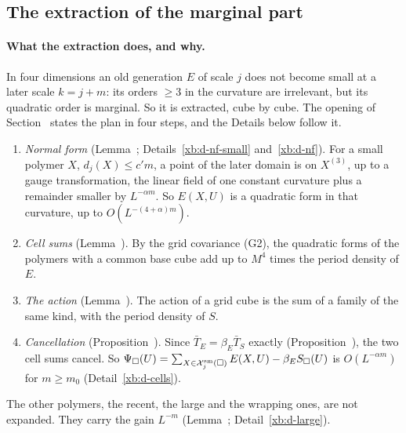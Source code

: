 \subsection{The extraction of the marginal part}\label{xb:extraction}

\paragraph{What the extraction does, and why.} In four dimensions an old generation $E$ of scale $j$ does not become small at a later scale $k=j+m$: its orders $\ge3$ in the curvature are irrelevant, but its quadratic order is marginal. So it is extracted, cube by cube. The opening of Section~ states the plan in four steps, and the Details below follow it.
\begin{enumerate}[label=(\arabic*)]
\item \emph{Normal form} (Lemma~; Details~\ref{xb:d-nf-small} and~\ref{xb:d-nf}). For a small polymer $X$, $d_j(X)\le c'm$, a point of the later domain is on $X^{(3)}$, up to a gauge transformation, the linear field of one constant curvature plus a remainder smaller by $L^{-\alpha m}$. So $E(X,U)$ is a quadratic form in that curvature, up to $O(L^{-(4+\alpha)m})$.
\item \emph{Cell sums} (Lemma~). By the grid covariance (G2), the quadratic forms of the polymers with a common base cube add up to $M^4$ times the period density of $E$.
\item \emph{The action} (Lemma~). The action of a grid cube is the sum of a family of the same kind, with the period density of $S$.
\item \emph{Cancellation} (Proposition~). Since $\bar T_E=\beta_E\bar T_S$ exactly (Proposition~), the two cell sums cancel. So $\Psi_\Box(U)=\sum_{X\in\mathcal X^{\rm sm}_j(\Box)}E(X,U)-\beta_ES_\Box(U)$ is $O(L^{-\alpha m})$ for $m\ge m_0$ (Detail~\ref{xb:d-cells}).
\end{enumerate}
The other polymers, the recent, the large and the wrapping ones, are not expanded. They carry the gain $L^{-m}$ (Lemma~; Detail~\ref{xb:d-large}).

